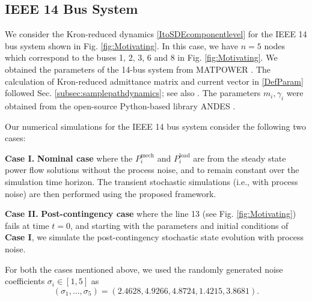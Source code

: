 \documentclass[10pt,twocolumn]{IEEEtran}
\newcommand{\blue}{\color{blue}}
\begin{document}
\subsection{IEEE 14 Bus System}\label{subsec:NumSimIEEEBus}
We consider the Kron-reduced dynamics \eqref{ItoSDEcomponentlevel} for the IEEE 14 bus system shown in Fig. \ref{fig:Motivating}. In this case, we have $n=5$ nodes which correspond to the buses 1, 2, 3, 6 and 8 in Fig. \ref{fig:Motivating}. We obtained the parameters of the 14-bus system from MATPOWER \cite{zimmerman2010matpower}. The calculation of Kron-reduced admittance matrix and current vector in \eqref{DefParam} followed Sec.  \ref{subsec:samplepathdynamics}; see also \cite{dorfler2012kron}. The parameters $m_{i}, \gamma_{i}$ were obtained from the open-source Python-based
library ANDES \cite{cui2021andes}.

Our numerical simulations for the IEEE 14 bus system consider the following two cases:

\noindent\textbf{Case I.} \textbf{Nominal case} where the $P_{i}^{\text{mech}}$ and $P_{i}^{\text{load}}$ are from the steady state power flow solutions without the process noise, and {\blue{are assumed}} to remain constant over the simulation time horizon. The transient stochastic simulations (i.e., with process noise) are then performed using the proposed framework.

\noindent\textbf{Case II.} \textbf{Post-contingency case} where the line 13 (see Fig. \ref{fig:Motivating}) fails at time $t=0$, and starting with the parameters and initial conditions of \textbf{Case I}, we simulate the post-contingency stochastic state evolution with process noise. %


 

For both the cases mentioned above, we used the randomly generated noise coefficients $\sigma_{i}\in [1,5]$ as
\[(\sigma_{1},\hdots,\sigma_5) = \left(2.4628, 4.9266, 4.8724, 1.4215, 3.8681\right).\]
\end{document}
